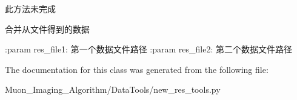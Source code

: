 \begin{DoxyVerb}此方法未完成

合并从文件得到的数据

:param res_file1: 第一个数据文件路径
:param res_file2: 第二个数据文件路径
\end{DoxyVerb}
 

The documentation for this class was generated from the following file\+:\begin{DoxyCompactItemize}
\item 
Muon\+\_\+\+Imaging\+\_\+\+Algorithm/\+Data\+Tools/new\+\_\+res\+\_\+tools.\+py\end{DoxyCompactItemize}
